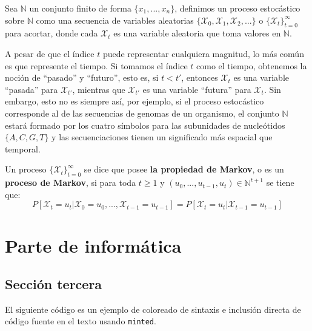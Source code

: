 \documentclass[oneside,openright,titlepage,numbers=noenddot,openany,headinclude,footinclude=true,
cleardoublepage=empty,abstractoff,BCOR=5mm,paper=a4,fontsize=12pt,main=spanish]{scrreprt}
\begin{document}
Sea $\mathbb{N}$ un conjunto finito de forma $\{x_1,...,x_n\}$, definimos un proceso estocástico sobre $\mathbb{N}$ como una secuencia de variables aleatorias $\{\mathcal{X}_0,\mathcal{X}_1,\mathcal{X}_2,...\}$ o $\{\mathcal{X}_t\}_{t=0}^{\infty}$ para acortar, donde cada $\mathcal{X}_t$ es una variable aleatoria que toma valores en $\mathbb{N}$.


A pesar de que el índice $t$ puede representar cualquiera magnitud, lo más común es que represente el tiempo. Si tomamos el índice $t$ como el tiempo, obtenemos la noción de \enquote{pasado} y \enquote{futuro}, esto es, si $t<t'$, entonces $\mathcal{X}_t$ es una variable \enquote{pasada} para $\mathcal{X}_{t'}$, mientras que $\mathcal{X}_{t'}$ es una variable \enquote{futura} para $\mathcal{X}_t$. Sin embargo, esto no es siempre así, por ejemplo, si el proceso estocástico corresponde al de las secuencias de genomas de un organismo, el conjunto $\mathbb{N}$ estará formado por los cuatro símbolos para las subunidades de nucleótidos $\{A,C,G,T\}$ y las secuenciaciones tienen un significado más espacial que temporal.
 
\begin{definition}
Un proceso $\{\mathcal{X}_t\}_{t=0}^{\infty}$ se dice que posee \textbf{la propiedad de Markov}, o es un \textbf{proceso de Markov}, si para toda $t\geq1$ y $(u_0,...,u_{t-1},u_t)\in\mathbb{N}^{t+1}$ se tiene que:
\[ \tag{1.1}\label{eq1.1}
    P[\mathcal{X}_t=u_t|\mathcal{X}_0=u_0,...,\mathcal{X}_{t-1}=u_{t-1}]=P[\mathcal{X}_t=u_t|\mathcal{X}_{t-1}=u_{t-1}]
\]
\end{definition}

\part{Parte de informática}
\chapter{Sección tercera}
El siguiente código es un ejemplo de coloreado de sintaxis e inclusión
directa de código fuente en el texto usando \texttt{minted}.
\end{document}

